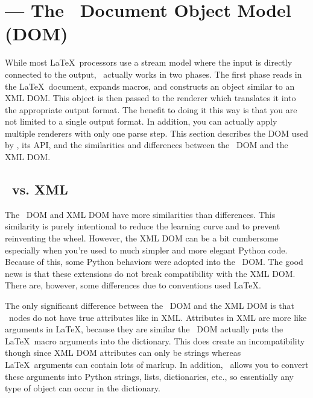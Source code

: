 
\section{ --- The \plasTeX\ Document Object Model (DOM)\label{sec:dom-api}}


While most \LaTeX\ processors use a stream model where the input is 
directly connected to the output, \plasTeX\ actually works in two phases.
The first phase reads in the \LaTeX\ document, expands macros, and
constructs an object similar to an XML DOM.  This object is then passed
to the renderer which translates it into the appropriate output format.
The benefit to doing it this way is that you are not limited to a single
output format.  In addition, you can actually apply multiple renderers
with only one parse step.  This section describes the DOM used by 
\plasTeX, its API, and the similarities and differences between the 
\plasTeX\ DOM and the XML DOM.

\subsection{\plasTeX\ vs. XML}

The \plasTeX\ DOM and XML DOM have more similarities than differences.
This similarity is purely intentional to reduce the learning curve and
to prevent reinventing the wheel.  However, the XML DOM can be a bit 
cumbersome especially when you're used to much simpler and more elegant
Python code.  Because of this, some Python behaviors were adopted into
the \plasTeX\ DOM.  The good news is that these extensions do not break
compatibility with the XML DOM.  There are, however, some differences 
due to conventions used \LaTeX.  

The only significant difference between the \plasTeX\ DOM and the XML DOM is 
that \plasTeX\ nodes do not have true attributes like in XML.  Attributes in XML
are more like arguments in \LaTeX, because they are similar the \plasTeX\
DOM actually puts the \LaTeX\ macro arguments into the 
dictionary.  This does create an incompatibility though since XML DOM
attributes can only be strings whereas \LaTeX\ arguments can contain 
lots of markup.  In addition, \plasTeX\ allows you to convert these 
arguments into Python strings, lists, dictionaries, etc., so essentially
any type of object can occur in the \member{attributes} dictionary.

